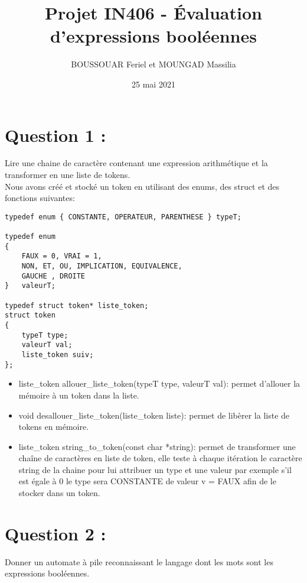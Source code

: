 \documentclass{article}
\begin{document}
\title{Projet IN406 - Évaluation d’expressions booléennes}

\author{BOUSSOUAR Feriel et MOUNGAD Massilia}
\date{25 mai 2021}

\newpage

\maketitle
\section*{Question 1 :}
Lire une chaine de caractère contenant une expression arithmétique et la transformer en une liste de tokens. \\
Nous avons créé et  stocké un token en utilisant  des enums, des struct et des fonctions suivantes:

\begin{verbatim}
typedef enum { CONSTANTE, OPERATEUR, PARENTHESE } typeT;

typedef enum
{
    FAUX = 0, VRAI = 1,
    NON, ET, OU, IMPLICATION, EQUIVALENCE,
    GAUCHE , DROITE
}   valeurT;

typedef struct token* liste_token;
struct token
{
    typeT type;
    valeurT val;
    liste_token suiv;
}; 
\end{verbatim}
\begin{itemize}
    \item liste\_token allouer\_liste\_token(typeT type, valeurT val): permet d'allouer la mémoire à un token dans la liste.
    \item void desallouer\_liste\_token(liste\_token liste): permet de libèrer la liste de tokens en mémoire.
    \item liste\_token string\_to\_token(const char  *string): permet de transformer une chaîne de caractères en liste de token, elle teste à chaque itération le  caractère string de la  chaine pour lui attribuer un type et une valeur par exemple s'il est égale à 0 le type sera CONSTANTE de valeur v = FAUX afin de le stocker dans un token.
\end{itemize}

\section*{Question 2 :}
Donner un automate à pile reconnaissant le langage dont les mots sont les expressions booléennes.
\vspace{5px}
\end{document}
